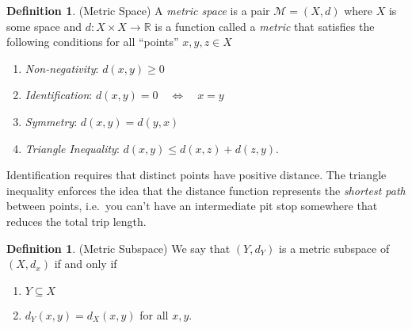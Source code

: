 \documentclass[12pt]{article}
\numberwithin{equation}{section} %
\theoremstyle{plain}
\theoremstyle{definition}
\newtheorem{defn}[thm]{Definition}
\theoremstyle{remark}
\newcommand{\R}{\mathbb{R}}
\begin{document}
\begin{defn}{(Metric Space)}
\label{defn:metric}
A \emph{metric space} is a pair $\mathscr{M}=(X,d)$ where $X$ is some
space and $d:X\times X\rightarrow \R$ is a function
called a \emph{metric} that satisfies the following conditions for all
``points'' $x,y,z\in X$
\begin{enumerate}
  \item \emph{Non-negativity}: $d(x,y)\geq 0$
  \item \emph{Identification}: $d(x,y) = 0 \quad \Leftrightarrow \quad x=y$
  \item \emph{Symmetry}: $d(x,y)=d(y,x)$
  \item \emph{Triangle Inequality}: $d(x,y) \leq d(x,z) + d(z,y)$.
\end{enumerate}
Identification requires that distinct points have positive distance.
The triangle inequality enforces the idea that the distance function
represents the \emph{shortest path} between points, i.e.\ you can't have
an intermediate pit stop somewhere that reduces the total trip length.
\end{defn}
\begin{defn}{(Metric Subspace)}
We say that $(Y,d_Y)$ is a metric subspace of $(X,d_x)$ if and only if
\begin{enumerate}
  \item $Y\subseteq X$
  \item $d_Y(x,y) = d_X(x,y)$ for all $x,y$.
\end{enumerate}
\end{defn}
\end{document}
